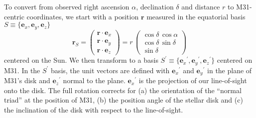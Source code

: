 \documentclass[preprint]{aastex}
\newcommand{\bvec}[1]{\ensuremath{\boldsymbol{#1}}}
\renewcommand{\vector}[1]{\ensuremath{\bvec{#1}}}
\newcommand{\uvec}[1]{\ensuremath{\vector{e}_{#1}}}
\newcommand{\ex}{\uvec{x}}
\newcommand{\ey}{\uvec{y}}
\newcommand{\ez}{\uvec{z}}
\newcommand{\epx}{\ensuremath{\uvec{x}^\prime}}
\newcommand{\epy}{\ensuremath{\uvec{y}^\prime}}
\newcommand{\epz}{\ensuremath{\uvec{z}^\prime}}
\begin{document}
To convert from observed right ascension $\alpha$, declination $\delta$ and
distance $r$ to M31-centric coordinates, we start with a position
$\vector{r}$ measured in the equatorial basis $S \equiv \{\ex,\ey,\ez\}$
\begin{equation}
    \vector{r}_S =
    \left ( \begin{array}{c}
        \vector{r} \cdot \ex \\
        \vector{r} \cdot \ey \\
        \vector{r} \cdot \ez
    \end{array} \right )
    = r \,\left ( \begin{array}{c}
        \cos \delta \, \cos \alpha \\
        \cos \delta \, \sin \delta \\
        \sin \delta
    \end{array} \right )
\end{equation}
centered on the Sun.  We then transform to a basis $S^\prime \equiv
\{\epx,\epy,\epz\}$
centered on M31. In the $S^\prime$ basis, the unit vectors are defined with
$\epx$ and $\epy$ in the plane of M31's disk and $\epz$ normal to the plane.
$\epx$ is the projection of our line-of-sight onto the disk. The full
rotation corrects for (a) the orientation of the ``normal triad'' at the
position of M31, (b) the position angle of the stellar disk and (c) the
inclination of the disk with respect to the line-of-sight.
\end{document}
